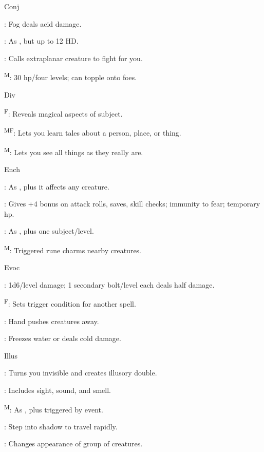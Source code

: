 Conj

: Fog deals acid damage.

: As , but up to 12 HD.

: Calls extraplanar creature to fight for you.

\textsuperscript{M}: 30 hp/four levels; can topple onto foes.

Div

\textsuperscript{F}: Reveals magical aspects of subject.

\textsuperscript{M}\textsuperscript{F}: Lets you learn tales about a person, place, or thing.

\textsuperscript{M}: Lets you see all things as they really are.

Ench

: As , plus it affects any creature.

: Gives +4 bonus on attack rolls, saves, skill checks; immunity to fear; temporary hp.

: As , plus one subject/level.

\textsuperscript{M}: Triggered rune charms nearby creatures.

Evoc

: 1d6/level damage; 1 secondary bolt/level each deals half damage.

\textsuperscript{F}: Sets trigger condition for another spell.

: Hand pushes creatures away.

: Freezes water or deals cold damage.

Illus

: Turns you invisible and creates illusory double.

: Includes sight, sound, and smell.

\textsuperscript{M}: As , plus triggered by event.

: Step into shadow to travel rapidly.

: Changes appearance of group of creatures.

